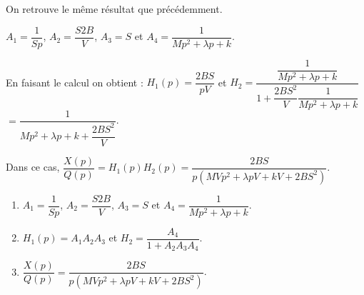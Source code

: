 \footnotesize
\begin{figure}[!h]
\end{figure}
\normalsize

On retrouve le même résultat que précédemment. 


$A_1=\dfrac{1}{Sp}$,  $A_2 = \dfrac{S2B}{V} $,  $A_3 = S$  et $A_4 = \dfrac{1}{Mp^2  +\lambda p  + k}$.


En faisant le calcul on obtient : 
$H_1(p)=\dfrac{2BS}{pV}  $ et $H_2 = \dfrac{\dfrac{1}{Mp^2  +\lambda p  + k}}{1+ \dfrac{2BS^2}{V}\dfrac{1}{Mp^2  +\lambda p  + k} }$  $= \dfrac{1}{Mp^2  +\lambda p  + k+ \dfrac{2BS^2}{V} }$.


\else
\fi

\ifprof

Dans ce cas, $\dfrac{X(p)}{Q(p)}=H_1(p)H_2(p)=\dfrac{2BS}{p\left(MVp^2  +\lambda pV  + kV+ 2BS^2\right) }$.

\else
\fi








\ifprof
\else
\begin{solution}
\begin{enumerate}
\item $A_1=\dfrac{1}{Sp}$,  $A_2 = \dfrac{S2B}{V} $,  $A_3 = S$  et $A_4 = \dfrac{1}{Mp^2  +\lambda p  + k}$.
\item $H_1(p)=A_1  A_2A_3$ et $H_2 = \dfrac{A_4}{1+ A_2A_3A_4 }$.
\item $\dfrac{X(p)}{Q(p)}=\dfrac{2BS}{p\left(MVp^2  +\lambda pV  + kV+ 2BS^2\right) }$.
\end{enumerate} 
\end{solution}


\fi